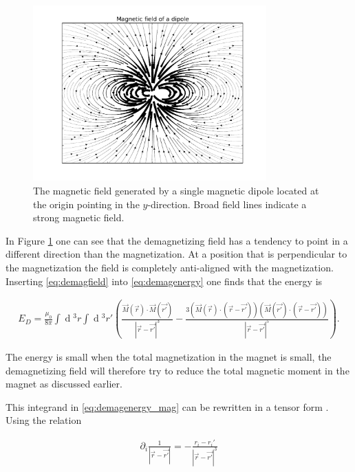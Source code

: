 \documentclass[1p]{elsarticle}		%
\renewcommand{\d}[1]{\ensuremath{\operatorname{d}\!{#1}}}
\begin{document}
\begin{figure}[h!]
\begin{center}
\includegraphics[width=0.8\textwidth]{Figures/dipole_field.pdf} 
\caption{The magnetic field generated by a single magnetic dipole located at the origin pointing in the $y$-direction. Broad field lines indicate a strong magnetic field.}
\label{fig:dipole_field} 
\end{center}
\end{figure}

In Figure \ref{fig:dipole_field} one can see that the demagnetizing field has a tendency to point in a different direction than the magnetization. At a position that is perpendicular to the magnetization the field is completely anti-aligned with the magnetization. Inserting \eqref{eq:demagfield} into \eqref{eq:demagenergy} one finds that the energy is

\begin{align}
\label{eq:demagenergy_mag}
E_D = \frac{\mu_0}{8\pi} \int \d {^3}r \int \d {^3}r' (\frac{\vec{M} (\vec{r}) \cdot \vec{M} (\vec{r'})}{|\vec{r}-\vec{r'}|^3} - \frac{3(\vec{M}(\vec{r}) \cdot (\vec{r}-\vec{r'})) (\vec{M}(\vec{r'}) \cdot(\vec{r}-\vec{r'}))}{|\vec{r}-\vec{r'}|^5}).
\end{align}

The energy is small when the total magnetization in the magnet is small, the demagnetizing field will therefore try to reduce the total magnetic moment in the magnet as discussed earlier. 

This integrand in \eqref{eq:demagenergy_mag} can be rewritten in a tensor form \cite{kruger2006current}. Using the relation

\begin{align}
\partial_i \frac{1}{|\vec{r}-\vec{r'}|} = -\frac{r_i-r_i'}{|\vec{r}-\vec{r'}|^3}
\end{align}
\end{document}

